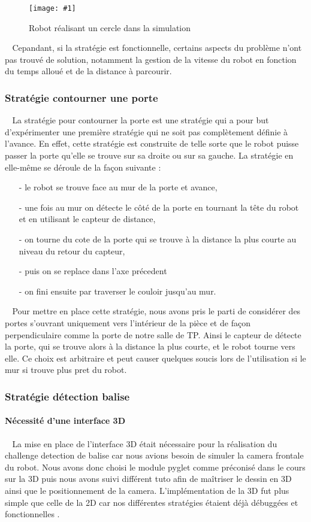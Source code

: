 \documentclass[12pt]{article}
\def\tab{$\>\>\>\>$}
\newcommand\img[2]{
\begin{figure}[!h]
  \centering
    \texttt{[image: \#1]}
  \caption{#2}
  \label{img:#1}
\end{figure}
}
\begin{document}
\img{Images/Cercle.png}{Robot réalisant un cercle dans la simulation}

\tab Cepandant, si la stratégie est fonctionnelle, certains aspects du problème n'ont pas trouvé de solution, notamment la gestion de la vitesse du robot en fonction du temps alloué et de la distance à parcourir.

\subsubsection{Stratégie contourner une porte}
\tab La stratégie pour contourner la porte est une stratégie qui a pour but d'expérimenter une première stratégie qui ne soit pas complètement définie à l'avance. En effet, cette stratégie est construite de telle sorte que le robot puisse passer la porte qu'elle se trouve sur sa droite ou sur sa gauche. La stratégie en elle-même se déroule de la façon suivante : \begin{itemize}
\item[-] le robot se trouve face au mur de la porte et avance,
\item[-] une fois au mur on détecte le côté de la porte en tournant la tête du robot et en utilisant le capteur de distance,
\item[-] on tourne du cote de la porte qui se trouve à la distance la plus courte au niveau du retour du capteur,
\item[-] puis on se replace dans l'axe précedent
\item[-] on fini ensuite par traverser le couloir jusqu'au mur.
\end{itemize}
\tab Pour mettre en place cette stratégie, nous avons pris le parti de considérer des portes s'ouvrant uniquement vers l'intérieur de la pièce et de façon perpendiculaire comme la porte de notre salle de TP. Ainsi le capteur de détecte la porte, qui se trouve alors à la distance la plus courte, et le robot tourne vers elle. Ce choix est arbitraire et peut causer quelques soucis lors de l'utilisation si le mur si trouve plus pret du robot.

\subsubsection{Stratégie détection balise}
\paragraph{Nécessité d'une interface 3D \\}
\tab La mise en place de l'interface 3D était nécessaire pour la réalisation du challenge detection de balise car nous avions besoin de simuler la camera frontale du robot. Nous avons donc choisi le module pyglet comme préconisé dans le cours sur la 3D puis nous avons suivi différent tuto afin de maîtriser le dessin en 3D ainsi que le positionnement de la camera. L'implémentation de la 3D fut plus simple que celle de la 2D car nos différentes stratégies étaient déjà débuggées et fonctionnelles .
\end{document}
